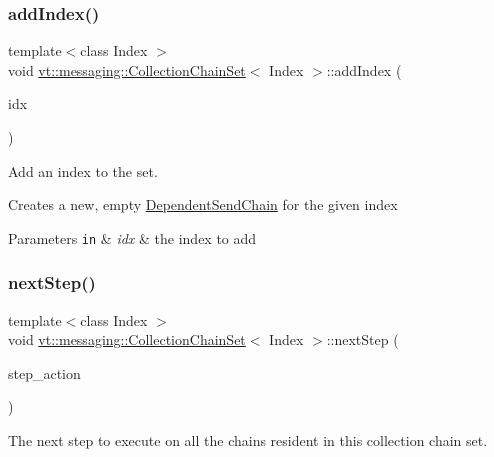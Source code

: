 \subsubsection{\texorpdfstring{add\+Index()}{addIndex()}}
{\footnotesize\ttfamily template$<$class Index $>$ \\
void \hyperlink{classvt_1_1messaging_1_1_collection_chain_set}{vt\+::messaging\+::\+Collection\+Chain\+Set}$<$ Index $>$\+::add\+Index (\begin{DoxyParamCaption}\item[{Index}]{idx }\end{DoxyParamCaption})\hspace{0.3cm}{\ttfamily [inline]}}



Add an index to the set. 

Creates a new, empty {\ttfamily \hyperlink{classvt_1_1messaging_1_1_dependent_send_chain}{Dependent\+Send\+Chain}} for the given index


\begin{DoxyParams}[1]{Parameters}
\mbox{\tt in}  & {\em idx} & the index to add \\
\hline
\end{DoxyParams}
\mbox{\label{classvt_1_1messaging_1_1_collection_chain_set_aa4e8a0a24fa7cde6e7f729f4dd002e64}} 
\subsubsection{\texorpdfstring{next\+Step()}{nextStep()}}
{\footnotesize\ttfamily template$<$class Index $>$ \\
void \hyperlink{classvt_1_1messaging_1_1_collection_chain_set}{vt\+::messaging\+::\+Collection\+Chain\+Set}$<$ Index $>$\+::next\+Step (\begin{DoxyParamCaption}\item[{std\+::function$<$ \hyperlink{structvt_1_1messaging_1_1_pending_send}{Pending\+Send}(Index)$>$}]{step\+\_\+action }\end{DoxyParamCaption})\hspace{0.3cm}{\ttfamily [inline]}}



The next step to execute on all the chains resident in this collection chain set. 

